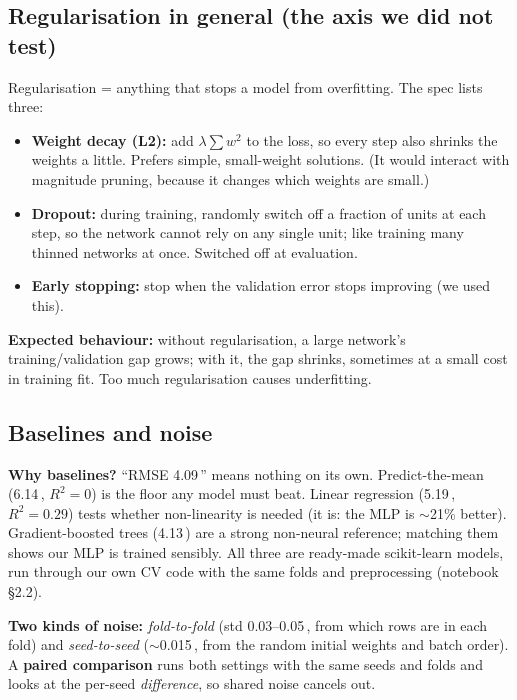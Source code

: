 \documentclass[11pt,a4paper]{article}
\newcommand{\A}{\,\text{\AA}}
\begin{document}
\subsection{Regularisation in general (the axis we did not test)}
Regularisation = anything that stops a model from overfitting. The spec lists three:
\begin{itemize}
  \item \textbf{Weight decay (L2):} add $\lambda \sum w^2$ to the loss, so every step also shrinks the weights a little.
        Prefers simple, small-weight solutions. (It would interact with magnitude pruning, because it changes which weights
        are small.)
  \item \textbf{Dropout:} during training, randomly switch off a fraction of units at each step, so the network cannot rely
        on any single unit; like training many thinned networks at once. Switched off at evaluation.
  \item \textbf{Early stopping:} stop when the validation error stops improving (we used this).
\end{itemize}
\textbf{Expected behaviour:} without regularisation, a large network's training/validation gap grows; with it, the gap
shrinks, sometimes at a small cost in training fit. Too much regularisation causes underfitting.

\subsection{Baselines and noise}
\textbf{Why baselines?} ``RMSE 4.09\A'' means nothing on its own. Predict-the-mean (6.14\A, $R^2 = 0$) is the floor any
model must beat. Linear regression (5.19\A, $R^2 = 0.29$) tests whether non-linearity is needed (it is: the MLP is
$\sim$21\% better). Gradient-boosted trees (4.13\A) are a strong non-neural reference; matching them shows our MLP is
trained sensibly. All three are ready-made scikit-learn models, run through our own CV code with the same folds and
preprocessing (notebook \S2.2).

\textbf{Two kinds of noise:} \emph{fold-to-fold} (std 0.03--0.05\A, from which rows are in each fold) and
\emph{seed-to-seed} ($\sim$0.015\A, from the random initial weights and batch order). A \textbf{paired comparison} runs
both settings with the same seeds and folds and looks at the per-seed \emph{difference}, so shared noise cancels out.
\end{document}
